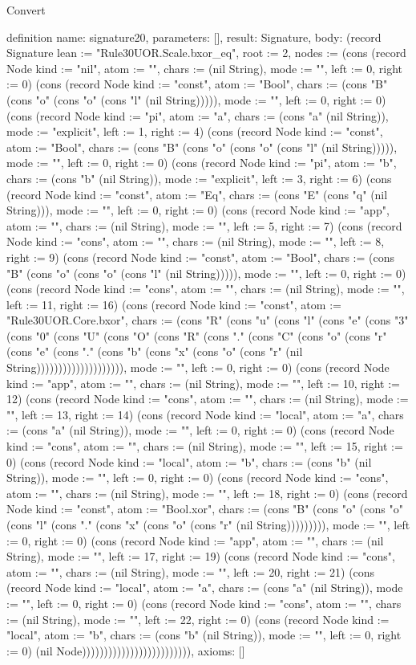 \begin{lexlean}{Convert}
\begin{semanticmodule}
definition{
  name: signature20,
  parameters: [],
  result: Signature,
  body: (record Signature {lean := "Rule30UOR.Scale.bxor_eq", root := 2, nodes := (cons (record Node {kind := "nil", atom := "", chars := (nil String), mode := "", left := 0, right := 0}) (cons (record Node {kind := "const", atom := "Bool", chars := (cons "B" (cons "o" (cons "o" (cons "l" (nil String))))), mode := "", left := 0, right := 0}) (cons (record Node {kind := "pi", atom := "a", chars := (cons "a" (nil String)), mode := "explicit", left := 1, right := 4}) (cons (record Node {kind := "const", atom := "Bool", chars := (cons "B" (cons "o" (cons "o" (cons "l" (nil String))))), mode := "", left := 0, right := 0}) (cons (record Node {kind := "pi", atom := "b", chars := (cons "b" (nil String)), mode := "explicit", left := 3, right := 6}) (cons (record Node {kind := "const", atom := "Eq", chars := (cons "E" (cons "q" (nil String))), mode := "", left := 0, right := 0}) (cons (record Node {kind := "app", atom := "", chars := (nil String), mode := "", left := 5, right := 7}) (cons (record Node {kind := "cons", atom := "", chars := (nil String), mode := "", left := 8, right := 9}) (cons (record Node {kind := "const", atom := "Bool", chars := (cons "B" (cons "o" (cons "o" (cons "l" (nil String))))), mode := "", left := 0, right := 0}) (cons (record Node {kind := "cons", atom := "", chars := (nil String), mode := "", left := 11, right := 16}) (cons (record Node {kind := "const", atom := "Rule30UOR.Core.bxor", chars := (cons "R" (cons "u" (cons "l" (cons "e" (cons "3" (cons "0" (cons "U" (cons "O" (cons "R" (cons "." (cons "C" (cons "o" (cons "r" (cons "e" (cons "." (cons "b" (cons "x" (cons "o" (cons "r" (nil String)))))))))))))))))))), mode := "", left := 0, right := 0}) (cons (record Node {kind := "app", atom := "", chars := (nil String), mode := "", left := 10, right := 12}) (cons (record Node {kind := "cons", atom := "", chars := (nil String), mode := "", left := 13, right := 14}) (cons (record Node {kind := "local", atom := "a", chars := (cons "a" (nil String)), mode := "", left := 0, right := 0}) (cons (record Node {kind := "cons", atom := "", chars := (nil String), mode := "", left := 15, right := 0}) (cons (record Node {kind := "local", atom := "b", chars := (cons "b" (nil String)), mode := "", left := 0, right := 0}) (cons (record Node {kind := "cons", atom := "", chars := (nil String), mode := "", left := 18, right := 0}) (cons (record Node {kind := "const", atom := "Bool.xor", chars := (cons "B" (cons "o" (cons "o" (cons "l" (cons "." (cons "x" (cons "o" (cons "r" (nil String))))))))), mode := "", left := 0, right := 0}) (cons (record Node {kind := "app", atom := "", chars := (nil String), mode := "", left := 17, right := 19}) (cons (record Node {kind := "cons", atom := "", chars := (nil String), mode := "", left := 20, right := 21}) (cons (record Node {kind := "local", atom := "a", chars := (cons "a" (nil String)), mode := "", left := 0, right := 0}) (cons (record Node {kind := "cons", atom := "", chars := (nil String), mode := "", left := 22, right := 0}) (cons (record Node {kind := "local", atom := "b", chars := (cons "b" (nil String)), mode := "", left := 0, right := 0}) (nil Node))))))))))))))))))))))))}),
  axioms: []
}


\end{semanticmodule}
\end{lexlean}
